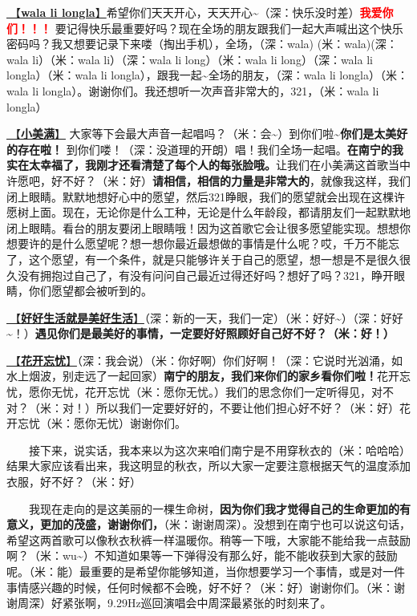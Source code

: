 \documentclass[]{ctexbook}
\begin{document}
\hyperref[wala-li-longla]{🎵【\textbf{wala li longla}】}希望你们天天开心，天天开心\textasciitilde（深：快乐没时差）\textbf{\textcolor{red}{我爱你们！！！} }要记得快乐最重要好吗？现在全场的朋友跟我们一起大声喊出这个快乐密码吗？我又想要记录下来喽（掏出手机），全场，（深：wala) (米：wala)(深：wala li）（米：wala li）（深：wala li long）（米：wala li long）（深：wala li longla）（米：wala li longla），跟我一起\textasciitilde 全场的朋友，（深：wala li longla）（米：wala li longla）。谢谢你们。我还想听一次声音非常大的，321，（米：wala li longla）

\hyperref[happy-ending]{🎵【\textbf{小美满}】} 大家等下会最大声音一起唱吗？（米：会\textasciitilde）到你们啦\textasciitilde{}\textbf{你们是太美好的存在啦！} 到你们喽！（深：没道理的开朗）唱！我们全场一起唱。\textbf{在南宁的我实在太幸福了，我刚才还看清楚了每个人的每张脸哦。}让我们在小美满这首歌当中许愿吧，好不好？（米：好）\textbf{请相信，相信的力量是非常大的}，就像我这样，我们闭上眼睛。默默地想好心中的愿望，然后321睁眼，我们的愿望就会出现在这棵许愿树上面。现在，无论你是什么工种，无论是什么年龄段，都请朋友们一起默默地闭上眼睛。看台的朋友要闭上眼睛哦！因为这首歌它会让很多愿望能实现。想想你想要许的是什么愿望呢？想一想你最近最想做的事情是什么呢？哎，千万不能忘了，这个愿望，有一个条件，就是只能够许关于自己的愿望，想一想是不是很久很久没有拥抱过自己了，有没有问问自己最近过得还好吗？想好了吗？321，睁开眼睛，你们愿望都会被听到的。

\hyperref[live-happy-life-happy]{🎵【\textbf{好好生活就是美好生活}】}（深：新的一天，我们一定）（米：好好\textasciitilde）（深：好好\textasciitilde！）\textbf{遇见你们是最美好的事情，一定要好好照顾好自己好不好？（米：好！）}

\hyperref[no-worries]{🎵【\textbf{花开忘忧}】}（深：我会说）（米：你好啊）你们好啊！（深：它说时光汹涌，如水上烟波，别走远了一起回家）\textbf{南宁的朋友，我们来你们的家乡看你们啦！}花开忘忧，愿你无忧，花开忘忧（米：愿你无忧。）我们的思念你们一定听得见，对不对？（米：对！）所以我们一定要好好的，不要让他们担心好不好？（米：好）花开忘忧（米：愿你无忧）谢谢你们。

  接下来，说实话，我本来以为这次来咱们南宁是不用穿秋衣的（米：哈哈哈）结果大家应该看出来，我这明显的秋衣，所以大家一定要注意根据天气的温度添加衣服，好不好？（米：好）

  我现在走向的是这美丽的一棵生命树，\textbf{因为你们我才觉得自己的生命更加的有意义，更加的茂盛，谢谢你们，}（米：谢谢周深）。没想到在南宁也可以说这句话，希望这两首歌可以像秋衣秋裤一样温暖你。稍等一下哦，大家能不能给我一点鼓励啊？（米：wu\textasciitilde）不知道如果等一下弹得没有那么好，能不能收获到大家的鼓励呢。（米：能）最重要的是希望你能够知道，当你想要学习一个事情，或是对一件事情感兴趣的时候，任何时候都不会晚，好不好？（米：好）谢谢你们。（米：谢谢周深）好紧张啊，9.29Hz巡回演唱会中周深最紧张的时刻来了。
\end{document}
